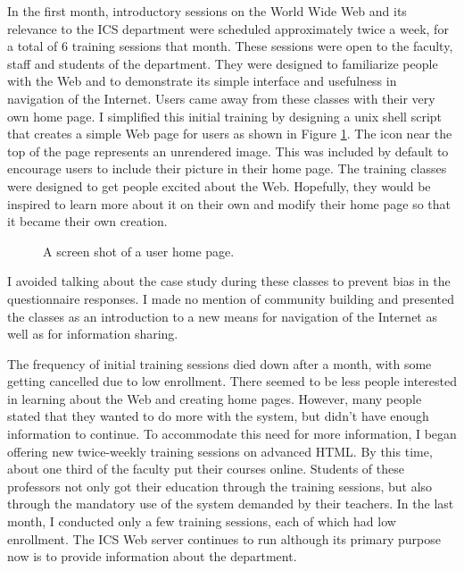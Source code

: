 In the first month, introductory sessions on the World Wide Web and its
relevance to the ICS department were scheduled approximately twice a week, for
a total of 6 training sessions that month.  These sessions were open to the
faculty, staff and students of the department.  They were designed to
familiarize people with the Web and to demonstrate its simple interface and
usefulness in navigation of the Internet.  Users came away from these classes
with their very own home page.  I simplified this initial training by designing
a unix shell script that creates a simple Web page for users as shown in Figure
\ref{fig:UserPage}.  The icon near the top of the page represents an unrendered
image.  This was included by default to encourage users to include their
picture in their home page.  The training classes were designed to get people
excited about the Web.  Hopefully, they would be inspired to learn more about
it on their own and modify their home page so that it became their own
creation.

\begin{figure}[htbp]
  \centerline{} 
\caption{A screen shot of a user home page.} 
\label{fig:UserPage}
\end{figure}

I avoided talking about the case study during these classes to prevent bias in
the questionnaire responses.  I made no mention of community building and
presented the classes as an introduction to a new means for navigation of the
Internet as well as for information sharing.


The frequency of initial training sessions died down after a month, with some
getting cancelled due to low enrollment.  There seemed to be less people
interested in learning about the Web and creating home pages.  However, many
people stated that they wanted to do more with the system, but didn't have
enough information to continue.  To accommodate this need for more information,
I began offering new twice-weekly training sessions on advanced HTML.  By this
time, about one third of the faculty put their courses online.  Students of
these professors not only got their education through the training sessions,
but also through the mandatory use of the system demanded by their teachers.
In the last month, I conducted only a few training sessions, each of which had
low enrollment.  The ICS Web server continues to run although its primary
purpose now is to provide information about the department.

